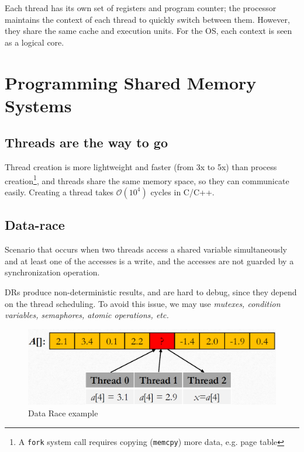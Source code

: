 Each thread has its own set of registers and program counter; the processor maintains the context of each thread to quickly switch between them.
However, they share the same cache and execution units.
For the OS, each context is seen as a logical core.

\section{Programming Shared Memory Systems}
\subsection{Threads are the way to go}

Thread creation is more lightweight and faster (from 3x to 5x) than process creation\footnote{A \texttt{fork} system call requires copying (\texttt{memcpy}) more data, e.g. page table}, and threads share the same memory space, so they can communicate easily.
Creating a thread takes $\mathcal{O}(10^4)$ cycles in C/C++.

\subsection{Data-race}
\begin{definition}
    Scenario that occurs when two threads access a shared variable simultaneously and at least one of the accesses is a write, and the accesses are not guarded by a synchronization operation.   
\end{definition}
\begin{paracol}{2}
   DRs produce non-deterministic results, and are hard to debug, since they depend on the thread scheduling. To avoid this issue, we may use \textit{mutexes, condition variables, semaphores, atomic operations, etc.}
   
   
   \switchcolumn

   \begin{figure}[htbp]
      \centering
      \includegraphics{images/04/data_race.png}
      \caption{Data Race example}
      \label{fig:04/data_race}
   \end{figure}

\end{paracol}

